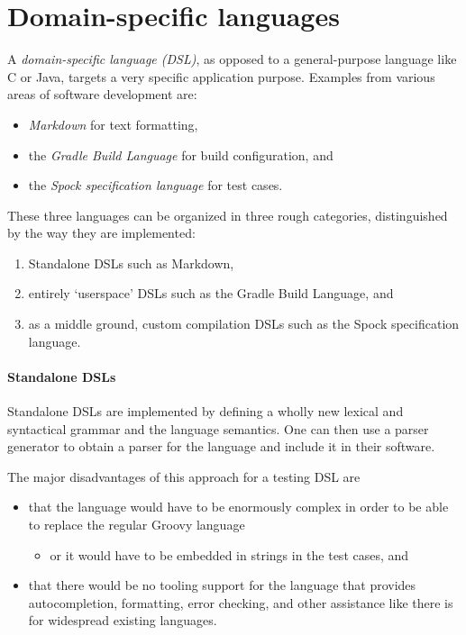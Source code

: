 \section{Domain-specific languages}
A \textit{domain-specific language (DSL)},
as opposed to a general-purpose language like C or Java,
targets a very specific application purpose.
Examples from various areas of software development are:
\begin{itemize}
  \item \textit{Markdown} for text formatting, \autocite{MarkdownIntro}
  \item the \textit{Gradle Build Language} for build configuration, \autocite{GradleWritingBuildScripts} and
  \item the \textit{Spock specification language} for test cases. \autocite{SpockFrameworkDoc}
\end{itemize}

These three languages can be organized in three rough categories,
distinguished by the way they are implemented:
\begin{enumerate}
  \item Standalone DSLs such as Markdown,
  \item entirely `userspace' DSLs such as the Gradle Build Language, and
  \item as a middle ground, custom compilation DSLs such as the Spock specification language.
\end{enumerate}

\paragraph{Standalone DSLs}
Standalone DSLs are implemented by defining a wholly new
lexical and syntactical grammar and the language semantics.
One can then use a parser generator to obtain a parser for the language
and include it in their software.

The major disadvantages of this approach for a testing DSL are
\begin{itemize}
  \item that the language would have to be enormously complex
    in order to be able to replace the regular Groovy language
    \begin{itemize}
      \item or it would have to be embedded in strings in the test cases, and
    \end{itemize}
  \item that there would be no tooling support for the language
    that provides autocompletion, formatting, error checking, and other assistance
    like there is for widespread existing languages.
\end{itemize}

